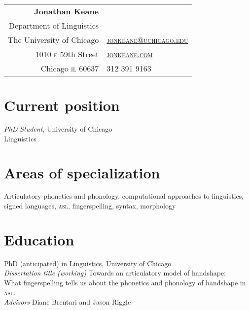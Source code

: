 \documentclass[10pt, letterpaper]{article}
\newcommand{\years}[1]{\marginpar{\scriptsize #1}}
\begin{document}
\thispagestyle{empty} %
\reversemarginpar
\raggedright

\begin{table}[!t]
  \begin{tabular*}{6.5in}{r|l}
    \hspace{3in}\textbf{\LARGE\sffamily Jonathan Keane}  &\\
Department of Linguistics & \\
  The University of Chicago & \href{mailto:jonkeane@uchicago.edu}{\textsc{jonkeane@uchicago.edu}}\\
1010 \textsc{e} 59th Street & \href{http://jonkeane.com}{\textsc{jonkeane.com}}\\
    Chicago \textsc{il} 60637 & 312 391 9163 \\
  \end{tabular*}
\end{table}
\setlength\parindent{0in}
\setlength\parskip{0ex}
\section*{Current position}
\emph{PhD Student}, University of Chicago\\
Linguistics\\

\section*{Areas of specialization}
Articulatory phonetics and phonology, computational approaches to linguistics, signed languages, \textsc{asl}, fingerspelling, syntax, morphology


\section*{Education}
\-\years{2013}PhD (anticipated) in Linguistics, University of Chicago \\
\hspace{2em} \textit{Dissertation title (working)} Towards an articulatory model of handshape:\\
\hspace{4em}What fingerspelling tells us about the phonetics and phonology of handshape in \textsc{asl}.\\
\hspace{2em} \textit{Advisors} Diane Brentari and Jason Riggle
\end{document}
